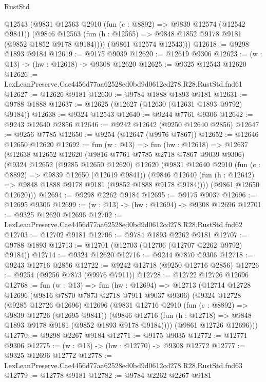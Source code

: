 \begin{lexlean}{RustStd}
\begin{coremodule}
        @12543
        (@9831
          @12563
          @2910
          (fun (c : @8892) => @9839 @12574 (@12542 @9841))
          (@9846 @12563 (fun (h : @12565) => @9848 @1852 @9178 @9181 (@9852 @1852 @9178 @9184))))
        (@9861 @12574 @12543)))
@12618 := @9298 @1893 @9184
@12619 := @9175 @9039
@12620 := @12619 @9306
@12623 := (w : @13) -> (hw : @12618) -> @9308 @12620
@12625 := @9325 @12543 @12620
@12626 := LexLeanPreserve.Cae4456d77aa62528ed0bd9d0612cd278.R28.RustStd.fnd61
@12627 := @12626 @9181
@12630 := @9784 @1888 @1893 @9181
@12631 := @9788 @1888
@12637 := @12625 (@12627 (@12630 (@12631 @1893 @9792) @9184))
@12638 := @9324 @12543
@12640 := @9244 @7761 @9306
@12642 := @9243 @12640 @2856
@12646 := @9242 @12642 (@9250 @12640 @2856)
@12647 := @9256 @7785
@12650 := @9254 (@12647 (@9976 @7867))
@12652 := @12646 @12650 @12620
@12692 := fun (w : @13) =>
  fun (hw : @12618) =>
  @12637
    (@12638
      @12652
      @12620
      (@9816 @7761 @7785 @2718 @7867 @9039 @9306)
      (@9324
        @12652
        (@9285 @12650 @12620)
        @12620
        (@9831
          @12640
          @2910
          (fun (c : @8892) => @9839 @12650 (@12619 @9841))
          (@9846 @12640 (fun (h : @12642) => @9848 @1888 @9178 @9181 (@9852 @1888 @9178 @9184))))
        (@9861 @12650 @12620)))
@12694 := @9298 @2262 @9184
@12695 := @9175 @9037
@12696 := @12695 @9306
@12699 := (w : @13) -> (hw : @12694) -> @9308 @12696
@12701 := @9325 @12620 @12696
@12702 := LexLeanPreserve.Cae4456d77aa62528ed0bd9d0612cd278.R28.RustStd.fnd62
@12703 := @12702 @9181
@12706 := @9784 @1893 @2262 @9181
@12707 := @9788 @1893
@12713 := @12701 (@12703 (@12706 (@12707 @2262 @9792) @9184))
@12714 := @9324 @12620
@12716 := @9244 @7870 @9306
@12718 := @9243 @12716 @2856
@12722 := @9242 @12718 (@9250 @12716 @2856)
@12726 := @9254 (@9256 @7873 (@9976 @7911))
@12728 := @12722 @12726 @12696
@12768 := fun (w : @13) =>
  fun (hw : @12694) =>
  @12713
    (@12714
      @12728
      @12696
      (@9816 @7870 @7873 @2718 @7911 @9037 @9306)
      (@9324
        @12728
        (@9285 @12726 @12696)
        @12696
        (@9831
          @12716
          @2910
          (fun (c : @8892) => @9839 @12726 (@12695 @9841))
          (@9846 @12716 (fun (h : @12718) => @9848 @1893 @9178 @9181 (@9852 @1893 @9178 @9184))))
        (@9861 @12726 @12696)))
@12770 := @9298 @2267 @9184
@12771 := @9175 @9035
@12772 := @12771 @9306
@12775 := (w : @13) -> (hw : @12770) -> @9308 @12772
@12777 := @9325 @12696 @12772
@12778 := LexLeanPreserve.Cae4456d77aa62528ed0bd9d0612cd278.R28.RustStd.fnd63
@12779 := @12778 @9181
@12782 := @9784 @2262 @2267 @9181

\end{coremodule}
\end{lexlean}
